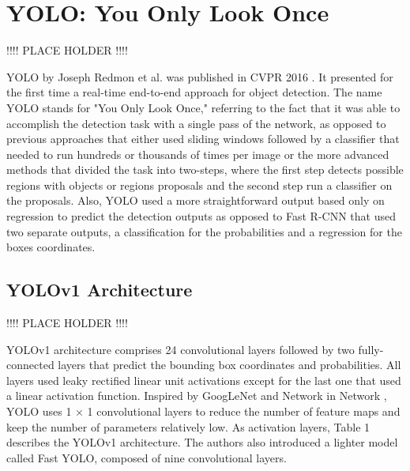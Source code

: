 \documentclass{article}
\begin{document}


\section{YOLO: You Only Look Once}

!!!! PLACE HOLDER !!!!

YOLO by Joseph Redmon et al. was published in CVPR 2016 \cite{redmon2016you}. It presented for the first time a real-time end-to-end approach for object detection. The name YOLO stands for "You Only Look Once," referring to the fact that it was able to accomplish the detection task with a single pass of the network, as opposed to previous approaches that either used sliding windows followed by a classifier that needed to run hundreds or thousands of times per image or the more advanced methods that divided the task into two-steps, where the first step detects possible regions with objects or regions proposals and the second step run a classifier on the proposals. Also, YOLO used a more straightforward output based only on regression to predict the detection outputs as opposed to Fast R-CNN \cite{7410526} that used two separate outputs, a classification for the probabilities and a regression for the boxes coordinates.

\subsection{YOLOv1 Architecture}

!!!! PLACE HOLDER !!!!

YOLOv1 architecture comprises 24 convolutional layers followed by two fully-connected layers that predict the bounding box coordinates and probabilities. All layers used leaky rectified linear unit activations \cite{maas2013rectifier} except for the last one that used a linear activation function. Inspired by GoogLeNet \cite{szegedy2015going} and Network in Network \cite{lin2013network}, YOLO uses 1 × 1 convolutional layers to reduce the number of feature maps and keep the number of parameters relatively low. As activation layers, Table 1 describes the YOLOv1 architecture. The authors also introduced a lighter model called Fast YOLO, composed of nine convolutional layers.
\end{document}
